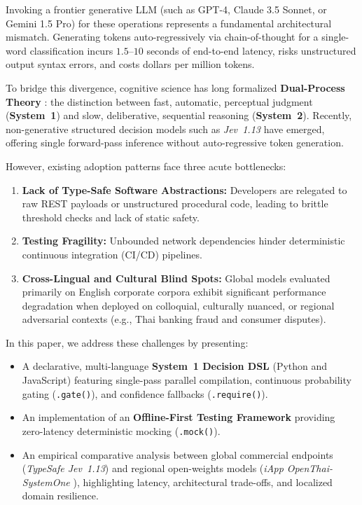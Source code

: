 \documentclass[10pt,twocolumn,letterpaper]{article}
\begin{document}
Invoking a frontier generative LLM (such as GPT-4, Claude 3.5 Sonnet, or Gemini 1.5 Pro) for these operations represents a fundamental architectural mismatch. Generating tokens auto-regressively via chain-of-thought \cite{wei2022chain} for a single-word classification incurs $1.5$--$10$ seconds of end-to-end latency, risks unstructured output syntax errors, and costs dollars per million tokens.

To bridge this divergence, cognitive science has long formalized \textbf{Dual-Process Theory} \cite{kahneman2011thinking}: the distinction between fast, automatic, perceptual judgment (\textbf{System~1}) and slow, deliberative, sequential reasoning (\textbf{System~2}). Recently, non-generative structured decision models such as \textit{Jev~1.13} \cite{typesafe2026jev} have emerged, offering single forward-pass inference without auto-regressive token generation.

However, existing adoption patterns face three acute bottlenecks:
\begin{enumerate}
    \item \textbf{Lack of Type-Safe Software Abstractions:} Developers are relegated to raw REST payloads or unstructured procedural code, leading to brittle threshold checks and lack of static safety.
    \item \textbf{Testing Fragility:} Unbounded network dependencies hinder deterministic continuous integration (CI/CD) pipelines.
    \item \textbf{Cross-Lingual and Cultural Blind Spots:} Global models evaluated primarily on English corporate corpora exhibit significant performance degradation when deployed on colloquial, culturally nuanced, or regional adversarial contexts (e.g., Thai banking fraud and consumer disputes).
\end{enumerate}

In this paper, we address these challenges by presenting:
\begin{itemize}
    \item A declarative, multi-language \textbf{System~1 Decision DSL} (Python and JavaScript) featuring single-pass parallel compilation, continuous probability gating (\texttt{.gate()}), and confidence fallbacks (\texttt{.require()}).
    \item An implementation of an \textbf{Offline-First Testing Framework} providing zero-latency deterministic mocking (\texttt{.mock()}).
    \item An empirical comparative analysis between global commercial endpoints (\textit{TypeSafe Jev~1.13}) and regional open-weights models (\textit{iApp OpenThai-SystemOne} \cite{iapp2026openthai}), highlighting latency, architectural trade-offs, and localized domain resilience.
\end{itemize}
\end{document}
